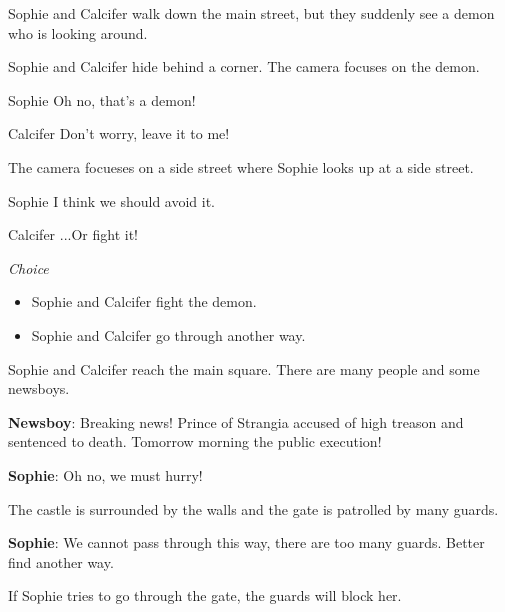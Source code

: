 
Sophie and Calcifer walk down the main street, but they suddenly see a demon who is looking around.

\begin{screenplay}

Sophie and Calcifer hide behind a corner. The camera focuses on the demon.

\begin{dialogue}[worried]{Sophie}
Oh no, that’s a demon!
\end{dialogue}
\begin{dialogue}[feisty]{Calcifer}
Don’t worry, leave it to me!
\end{dialogue}

The camera focueses on a side street where Sophie looks up at a side street.

\begin{dialogue}{Sophie}
I think we should avoid it.
\end{dialogue}

\begin{dialogue}{Calcifer}
...Or fight it!
\end{dialogue}
\end{screenplay}
\vspace{1em}

\textit{Choice}
\begin{itemize}
  \item Sophie and Calcifer fight the demon.
  \item Sophie and Calcifer go through another way.
\end{itemize}
  
Sophie and Calcifer reach the main square. There are many people and some newsboys.

\textbf{Newsboy}: Breaking news! Prince of Strangia accused of high treason and sentenced to death. Tomorrow morning the public execution!

\textbf{Sophie}: Oh no, we must hurry!

The castle is surrounded by the walls and the gate is patrolled by many guards.


\textbf{Sophie}: We cannot pass through this way, there are too many guards. Better find another way.

If Sophie tries to go through the gate, the guards will block her.

